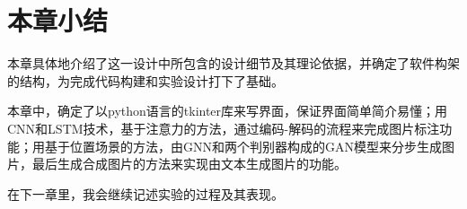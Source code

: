 \section{本章小结}
本章具体地介绍了这一设计中所包含的设计细节及其理论依据，并确定了软件构架的结构，为完成代码构建和实验设计打下了基础。

本章中，确定了以python语言的tkinter库来写界面，保证界面简单简介易懂；用CNN和LSTM技术，基于注意力的方法，通过编码-解码的流程来完成图片标注功能；用基于位置场景的方法，由GNN和两个判别器构成的GAN模型来分步生成图片，最后生成合成图片的方法来实现由文本生成图片的功能。

在下一章里，我会继续记述实验的过程及其表现。



